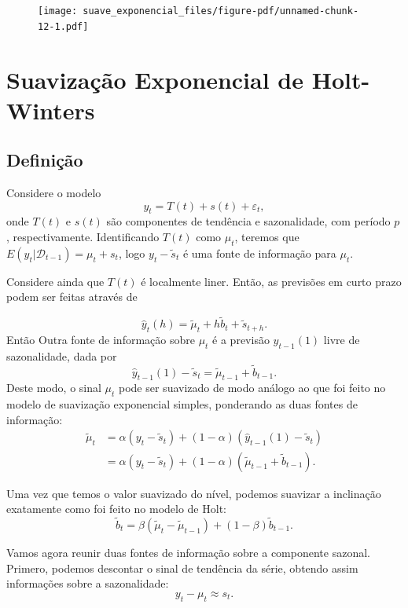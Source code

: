 \documentclass[
  letterpaper,
  DIV=11,
  numbers=noendperiod]{scrartcl}
\theoremstyle{plain}
\theoremstyle{plain}
\theoremstyle{definition}
\theoremstyle{definition}
\theoremstyle{remark}
\begin{document}
\begin{figure}[H]

{\centering \texttt{[image: suave\_exponencial\_files/figure-pdf/unnamed-chunk-12-1.pdf]}

}

\end{figure}

\hypertarget{suavizauxe7uxe3o-exponencial-de-holt-winters}{%
\section{Suavização Exponencial de
Holt-Winters}\label{suavizauxe7uxe3o-exponencial-de-holt-winters}}

\hypertarget{definiuxe7uxe3o-1}{%
\subsection{Definição}\label{definiuxe7uxe3o-1}}

Considere o modelo \[y_t = T(t) + s(t)+\varepsilon_t,\] onde \(T(t)\) e
\(s(t)\) são componentes de tendência e sazonalidade, com período \(p\),
respectivamente. Identificando \(T(t)\) como \(\mu_t\), teremos que
\(E(y_t|\mathcal{D}_{t-1})=\mu_t+s_t\), logo \(y_t-\tilde{s}_t\) é uma
fonte de informação para \(\mu_t\).

Considere ainda que \(T(t)\) é localmente liner. Então, as previsões em
curto prazo podem ser feitas através de

\[\hat{y}_t(h) = \tilde{\mu}_t + h \tilde{b}_t + \tilde{s}_{t+h}.\]
Então Outra fonte de informação sobre \(\mu_t\) é a previsão
\(\hat{y}_{t-1}(1)\) livre de sazonalidade, dada por
\[\hat{y}_{t-1}(1)-\tilde{s}_{t}=\tilde{\mu}_{t-1} + \tilde{b}_{t-1}.\]
Deste modo, o sinal \(\mu_t\) pode ser suavizado de modo análogo ao que
foi feito no modelo de suavização exponencial simples, ponderando as
duas fontes de informação: \[\begin{align*}
     \tilde{\mu}_t &= \alpha ( y_t - \tilde{s}_t) + (1-\alpha) (\hat{y}_{t-1}(1) -\tilde{s}_{t})\\
     &= \alpha (y_t - \tilde{s}_t) + (1-\alpha) (\tilde{\mu}_{t-1}+ \tilde{b}_{t-1}).
    \end{align*}\]

Uma vez que temos o valor suavizado do nível, podemos suavizar a
inclinação exatamente como foi feito no modelo de Holt:
\[\tilde{b}_t = \beta (\tilde{\mu}_t - \tilde{\mu}_{t-1}) + (1-\beta) \tilde{b}_{t-1}.\]

Vamos agora reunir duas fontes de informação sobre a componente sazonal.
Primero, podemos descontar o sinal de tendência da série, obtendo assim
informações sobre a sazonalidade: \[y_t - \mu_t\approx s_t.\]
\end{document}
